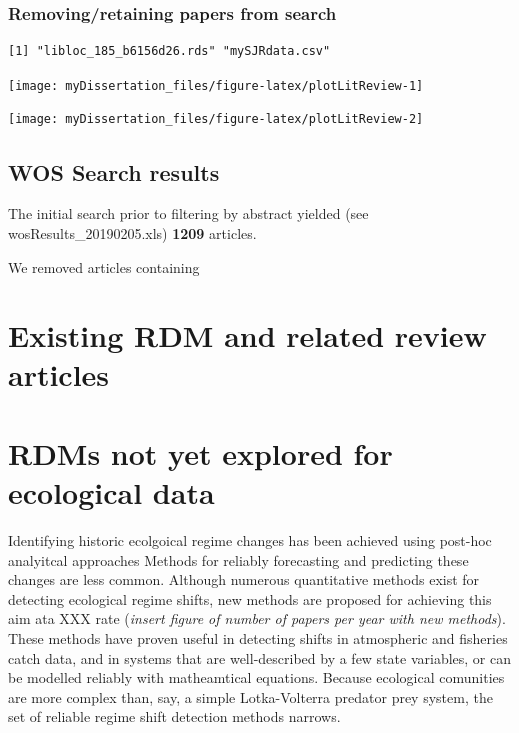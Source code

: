 \documentclass[12pt,twoside]{reedthesis}
\begin{document}
\hypertarget{removingretaining-papers-from-search}{%
\subsubsection{Removing/retaining papers from search}\label{removingretaining-papers-from-search}}
\begin{verbatim}
[1] "libloc_185_b6156d26.rds" "mySJRdata.csv"          
\end{verbatim}
\begin{center}\texttt{[image: myDissertation\_files/figure-latex/plotLitReview-1]} \end{center}
\begin{center}\texttt{[image: myDissertation\_files/figure-latex/plotLitReview-2]} \end{center}

\hypertarget{wos-search-results}{%
\subsection{WOS Search results}\label{wos-search-results}}

The initial search prior to filtering by abstract yielded (see wosResults\_20190205.xls) \textbf{1209} articles.

We removed articles containing

\hypertarget{existing-rdm-and-related-review-articles}{%
\section{Existing RDM and related review articles}\label{existing-rdm-and-related-review-articles}}

\hypertarget{rdms-not-yet-explored-for-ecological-data}{%
\section{RDMs not yet explored for ecological data}\label{rdms-not-yet-explored-for-ecological-data}}

Identifying historic ecolgoical regime changes has been achieved using post-hoc analyitcal approaches Methods for reliably forecasting and predicting these changes are less common. Although numerous quantitative methods exist for detecting ecological regime shifts, new methods are proposed for achieving this aim ata XXX rate (\emph{insert figure of number of papers per year with new methods}). These methods have proven useful in detecting shifts in atmospheric and fisheries catch data, and in systems that are well-described by a few state variables, or can be modelled reliably with matheamtical equations. Because ecological comunities are more complex than, say, a simple Lotka-Volterra predator prey system, the set of reliable regime shift detection methods narrows.
\end{document}

